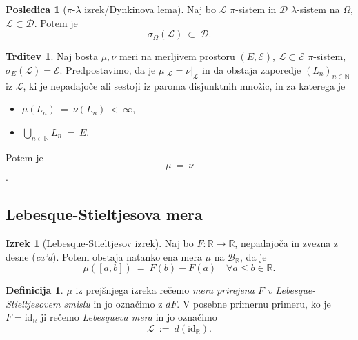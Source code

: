 \documentclass[11pt]{article}
\newcommand{\R}{\mathbb{R}}
\newcommand{\N}{\mathbb{N}}
\newcommand{\B}{\mathcal{B}}
\newcommand{\D}{\mathcal{D}}
\renewcommand{\L}{\mathcal{L}}
\newcommand{\LL}{\mathscr{L}}
\newcommand{\EE}{\mathcal{E}}
\newcommand{\1}{\mathbbm{1}}
\newcommand{\id}{\text{id}}
\theoremstyle{definition}
\newtheorem{definicija}{Definicija}[section]
\theoremstyle{definition}
\newtheorem{trditev}{Trditev}[section]
\theoremstyle{definition}
\newtheorem{izrek}{Izrek}[section]
\theoremstyle{definition}
\newtheorem*{posledica}{Posledica}
\begin{document}
\begin{posledica}[$\pi$-$\lambda$ izrek/Dynkinova lema]

Naj bo $\L$ $\pi$-sistem in $\D$ $\lambda$-sistem na $\Omega$, $\L \subset \D$. Potem je
$$\sigma_\Omega(\L) ~\subset~ \D.$$

\end{posledica}
\vspace{0.5cm}

\begin{trditev}

Naj bosta $\mu, \nu$ meri na merljivem prostoru $(E,\EE)$, $\L \subset \EE$ $\pi$-sistem, $\sigma_E(\L) = \EE$. Predpostavimo, da je $\mu |_\L = \nu |_\L$ in da obstaja zaporedje $(L_n)_{n \in \N}$ iz $\L$, ki je nepadajoče ali sestoji iz paroma disjunktnih množic, in za katerega je
\begin{itemize}
	\item $\mu(L_n) ~=~ \nu(L_n) ~<~ \infty$,
	\item $\bigcup_{n \in \N} L_n ~=~ E$.
\end{itemize}
Potem je 
$$\mu ~=~ \nu$$.

\end{trditev}
\vspace{0.5cm}


\subsection{Lebesque-Stieltjesova mera}
\vspace{0.5cm}

\begin{izrek}[Lebesque-Stieltjesov izrek]

Naj bo $F: \R \rightarrow \R$, nepadajoča in zvezna z desne (\textit{ca'd}). Potem obstaja natanko ena mera $\mu$ na $\B_\R$, da je
$$\mu([a,b]) ~=~ F(b) - F(a) \quad \forall a\leq b \in \R.$$

\end{izrek}
\vspace{0.5cm}

\begin{definicija}

$\mu$ iz prejšnjega izreka rečemo \textit{mera prirejena $F$ v Lebesque-Stieltjesovem smislu} in jo označimo z $dF$. V posebne primernu primeru, ko je $F = \id_\R$ ji rečemo \textit{Lebesqueva mera} in jo označimo
$$\LL ~:=~ d(\id_\R).$$

\end{definicija}
\vspace{0.5cm}
\end{document}
